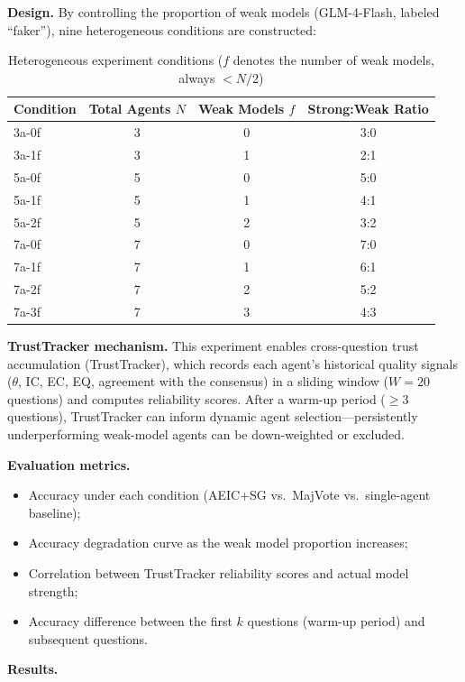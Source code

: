 \documentclass[12pt,a4paper]{article}
\begin{document}
\textbf{Design.} By controlling the proportion of weak models (GLM-4-Flash, labeled ``faker''), nine heterogeneous conditions are constructed:

\begin{table}[H]
\centering
\caption{Heterogeneous experiment conditions ($f$ denotes the number of weak models, always $< N/2$)}\label{tab:exp3_cond}
\begin{tabular}{lccc}
\toprule
Condition & Total Agents $N$ & Weak Models $f$ & Strong:Weak Ratio \\
\midrule
3a-0f & 3 & 0 & 3:0 \\
3a-1f & 3 & 1 & 2:1 \\
5a-0f & 5 & 0 & 5:0 \\
5a-1f & 5 & 1 & 4:1 \\
5a-2f & 5 & 2 & 3:2 \\
7a-0f & 7 & 0 & 7:0 \\
7a-1f & 7 & 1 & 6:1 \\
7a-2f & 7 & 2 & 5:2 \\
7a-3f & 7 & 3 & 4:3 \\
\bottomrule
\end{tabular}
\end{table}

\textbf{TrustTracker mechanism.} This experiment enables cross-question trust accumulation (TrustTracker), which records each agent's historical quality signals ($\theta$, IC, EC, EQ, agreement with the consensus) in a sliding window ($W=20$ questions) and computes reliability scores. After a warm-up period ($\geq 3$ questions), TrustTracker can inform dynamic agent selection---persistently underperforming weak-model agents can be down-weighted or excluded.

\textbf{Evaluation metrics.}
\begin{itemize}[nosep]
    \item Accuracy under each condition (AEIC+SG vs.\ MajVote vs.\ single-agent baseline);
    \item Accuracy degradation curve as the weak model proportion increases;
    \item Correlation between TrustTracker reliability scores and actual model strength;
    \item Accuracy difference between the first $k$ questions (warm-up period) and subsequent questions.
\end{itemize}

\textbf{Results.}
\end{document}
